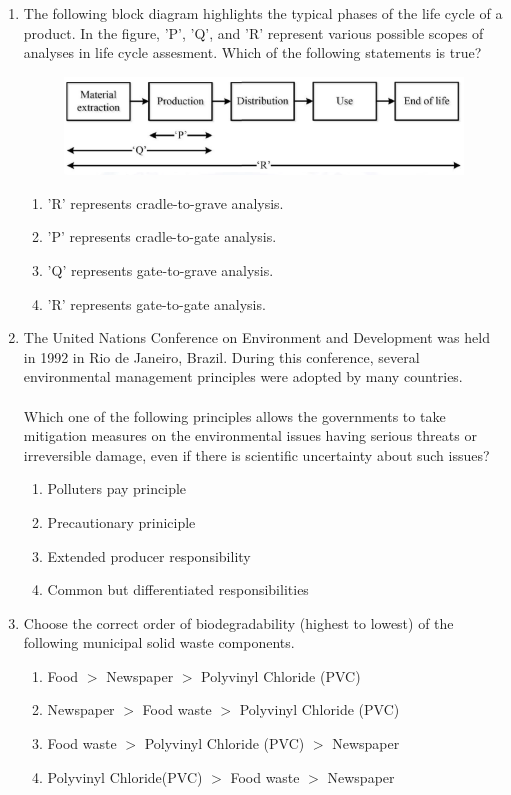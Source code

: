 \documentclass[journal]{IEEEtran}
\begin{document}
\begin{enumerate}[start=1]
\item The following block diagram highlights the typical phases of the life cycle of a product. In the figure, 'P', 'Q', and 'R' represent various possible scopes of analyses in life cycle assesment. Which of the following statements is true?
\hfill{}
\begin{figure}[H]
    \centering
    \includegraphics[width=0.75\columnwidth]{figs/image(q11).png}
\end{figure}
\begin{enumerate}
    \item 'R' represents cradle-to-grave analysis.
    \item 'P' represents cradle-to-gate analysis.
    \item 'Q' represents gate-to-grave analysis.
    \item 'R' represents gate-to-gate analysis.
\end{enumerate}

\item The United Nations Conference on Environment and Development was held in 1992 in Rio de Janeiro, Brazil. During this conference, several environmental management principles were adopted by many countries.\\ \\
Which one of the following principles allows the governments to take mitigation measures on the environmental issues having serious threats or irreversible damage, even if there is scientific uncertainty about such issues?
\hfill{}
\begin{enumerate}
    \item Polluters pay principle
    \item Precautionary priniciple
    \item Extended producer responsibility
    \item Common but differentiated responsibilities
\end{enumerate}

\item Choose the correct order of biodegradability (highest to lowest) of the following municipal solid waste components.
\hfill{}
\begin{enumerate}
    \item Food $>$ Newspaper $>$ Polyvinyl Chloride (PVC)
    \item Newspaper $>$ Food waste $>$ Polyvinyl Chloride (PVC)
    \item Food waste $>$ Polyvinyl Chloride (PVC) $>$ Newspaper
    \item Polyvinyl Chloride(PVC) $>$ Food waste $>$ Newspaper
\end{enumerate}


\end{enumerate}
\end{document}
